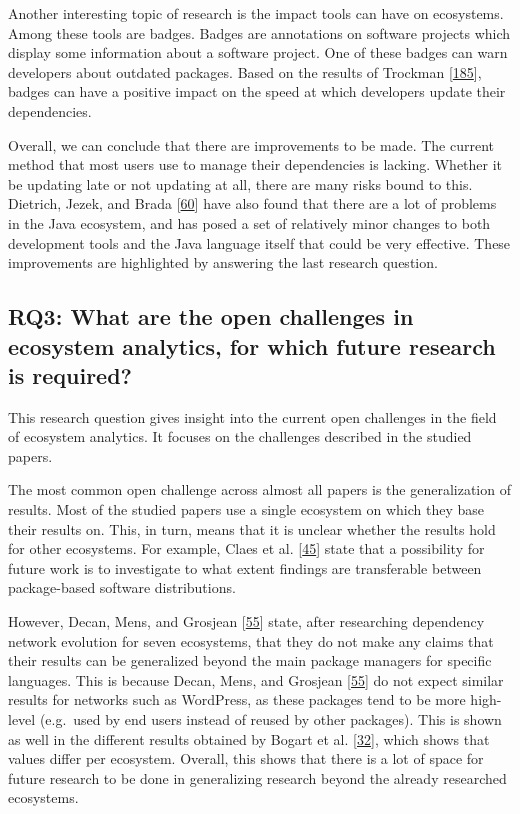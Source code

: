 \documentclass[]{book}
\begin{document}
Another interesting topic of research is the impact tools can have on
ecosystems. Among these tools are badges. Badges are annotations on
software projects which display some information about a software
project. One of these badges can warn developers about outdated
packages. Based on the results of Trockman
{[}\protect\hyperlink{ref-Trockman2018}{185}{]}, badges can have a
positive impact on the speed at which developers update their
dependencies.

Overall, we can conclude that there are improvements to be made. The
current method that most users use to manage their dependencies is
lacking. Whether it be updating late or not updating at all, there are
many risks bound to this. Dietrich, Jezek, and Brada
{[}\protect\hyperlink{ref-Dietrich2014}{60}{]} have also found that
there are a lot of problems in the Java ecosystem, and has posed a set
of relatively minor changes to both development tools and the Java
language itself that could be very effective. These improvements are
highlighted by answering the last research question.

\subsection{RQ3: What are the open challenges in ecosystem analytics,
for which future research is
required?}\label{rq3-what-are-the-open-challenges-in-ecosystem-analytics-for-which-future-research-is-required}

This research question gives insight into the current open challenges in
the field of ecosystem analytics. It focuses on the challenges described
in the studied papers.

The most common open challenge across almost all papers is the
generalization of results. Most of the studied papers use a single
ecosystem on which they base their results on. This, in turn, means that
it is unclear whether the results hold for other ecosystems. For
example, Claes et al. {[}\protect\hyperlink{ref-Claes2015}{45}{]} state
that a possibility for future work is to investigate to what extent
findings are transferable between package-based software distributions.

However, Decan, Mens, and Grosjean
{[}\protect\hyperlink{ref-Decan2018}{55}{]} state, after researching
dependency network evolution for seven ecosystems, that they do not make
any claims that their results can be generalized beyond the main package
managers for specific languages. This is because Decan, Mens, and
Grosjean {[}\protect\hyperlink{ref-Decan2018}{55}{]} do not expect
similar results for networks such as WordPress, as these packages tend
to be more high-level (e.g.~used by end users instead of reused by other
packages). This is shown as well in the different results obtained by
Bogart et al. {[}\protect\hyperlink{ref-Bogart2016}{32}{]}, which shows
that values differ per ecosystem. Overall, this shows that there is a
lot of space for future research to be done in generalizing research
beyond the already researched ecosystems.
\end{document}
